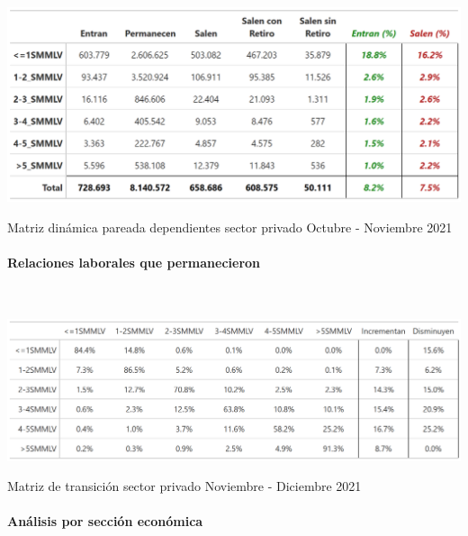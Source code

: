 \begin{table}[!htbp]
\label{tabla:sector_privado:matriz_dinamica_mes_11_2021}
\centering
\includegraphics[width = 15cm]{results/02_longitudinal/salida_resumen_dependientes_referencia_21.png}
\caption{Matriz dinámica pareada dependientes sector privado Octubre - Noviembre 2021}%
\end{table}

\FloatBarrier
\paragraph{Relaciones laborales que permanecieron}\mbox{}\\

\begin{table}[!htbp]
\label{tabla:sector_privado:matriz_transicion_mes_11_12_2021}
\centering
\includegraphics[width = 15cm]{results/02_longitudinal/salida_matriz_transicion_dependientes_21.png}
\caption{Matriz de transición sector privado Noviembre - Diciembre 2021}%
\end{table}

\FloatBarrier
\paragraph{Análisis por sección económica}\mbox{}\\

